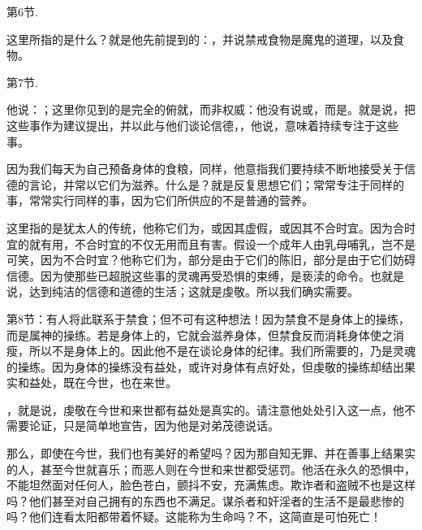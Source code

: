 第6节. \par

这里所指的是什么？就是他先前提到的：，并说禁戒食物是魔鬼的道理，以及食物。\par

第7节. \par

他说：；这里你见到的是完全的俯就，而非权威：他没有说或，而是。就是说，把这些事作为建议提出，并以此与他们谈论信德，，他说，意味着持续专注于这些事。\par

因为我们每天为自己预备身体的食粮，同样，他意指我们要持续不断地接受关于信德的言论，并常以它们为滋养。什么是？就是反复思想它们；常常专注于同样的事，常常实行同样的事，因为它们所供应的不是普通的营养。\par

这里指的是犹太人的传统，他称它们为，或因其虚假，或因其不合时宜。因为合时宜的就有用，不合时宜的不仅无用而且有害。假设一个成年人由乳母哺乳，岂不是可笑，因为不合时宜？他称它们为，部分是由于它们的陈旧，部分是由于它们妨碍信德。因为使那些已超脱这些事的灵魂再受恐惧的束缚，是亵渎的命令。\newline{}也就是说，达到纯洁的信德和道德的生活；这就是虔敬。所以我们确实需要。\par

第8节：有人将此联系于禁食；但不可有这种想法！因为禁食不是身体上的操练，而是属神的操练。若是身体上的，它就会滋养身体，但禁食反而消耗身体使之消瘦，所以不是身体上的。因此他不是在谈论身体的纪律。我们所需要的，乃是灵魂的操练。因为身体的操练没有益处，或许对身体有点好处，但虔敬的操练却结出果实和益处，既在今世，也在来世。\newline{}\par

，就是说，虔敬在今世和来世都有益处是真实的。请注意他处处引入这一点，他不需要论证，只是简单地宣告，因为他是对弟茂德说话。\par

那么，即使在今世，我们也有美好的希望吗？因为那自知无罪、并在善事上结果实的人，甚至今世就喜乐；而恶人则在今世和来世都受惩罚。他活在永久的恐惧中，不能坦然面对任何人，脸色苍白，颤抖不安，充满焦虑。欺诈者和盗贼不也是这样吗？他们甚至对自己拥有的东西也不满足。谋杀者和奸淫者的生活不是最悲惨的吗？他们连看太阳都带着怀疑。这能称为生命吗？不，这简直是可怕死亡！\par

